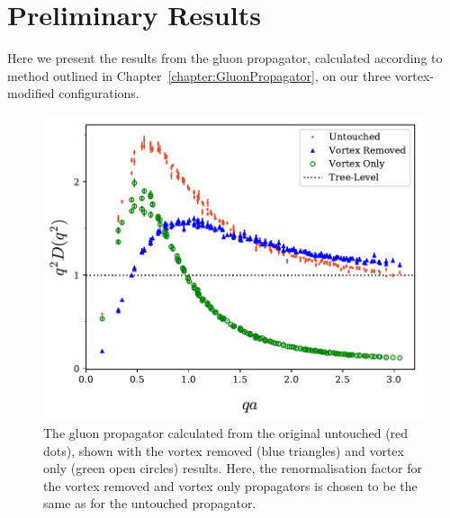 \section{Preliminary Results}
Here we present the results from the gluon propagator, calculated according to method outlined in Chapter~\ref{chapter:GluonPropagator}, on our three vortex-modified configurations.
%
\begin{figure}[tb]
\centering
\includegraphics[width=\linewidth]{./ScalarGluComp_q2_NoCoolSum.pdf}
\caption[The gluon propagator calculated from the original untouched, shown with the vortex removed and vortex only results.]{\label{fig:NoCool}The gluon propagator calculated from the original untouched (red dots), shown with the vortex removed (blue triangles) and vortex only (green open circles) results. Here, the renormalisation factor for the vortex removed and vortex only propagators is chosen to be the same as for the untouched propagator.}
\end{figure}
%
